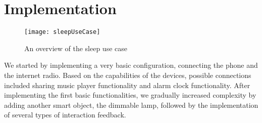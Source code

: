\section{Implementation}
\label{D3Implementation}
  
\begin{figure}
\centerline{
\texttt{[image: sleepUseCase]}}
\caption{An overview of the sleep use case}
\label{sleep}
\end{figure}


We started by implementing a very basic configuration, connecting the phone and the internet radio. Based on the capabilities of the devices, possible connections included sharing music player functionality and alarm clock functionality. After implementing the first basic functionalities, we gradually increased complexity by adding another smart object, the dimmable lamp, followed by the implementation of several types of interaction feedback.



